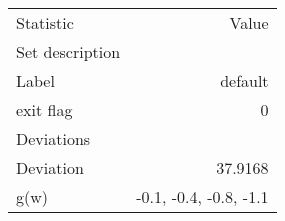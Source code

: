 \begin{tabular}{lr}
\hline
Statistic & Value  \\ 
Set description &    \\ 
Label & default  \\ 
exit flag & 0  \\ 
Deviations &    \\ 
Deviation & 37.9168  \\ 
g(w) & -0.1, -0.4, -0.8, -1.1  \\ 
\hline
\end{tabular}%
